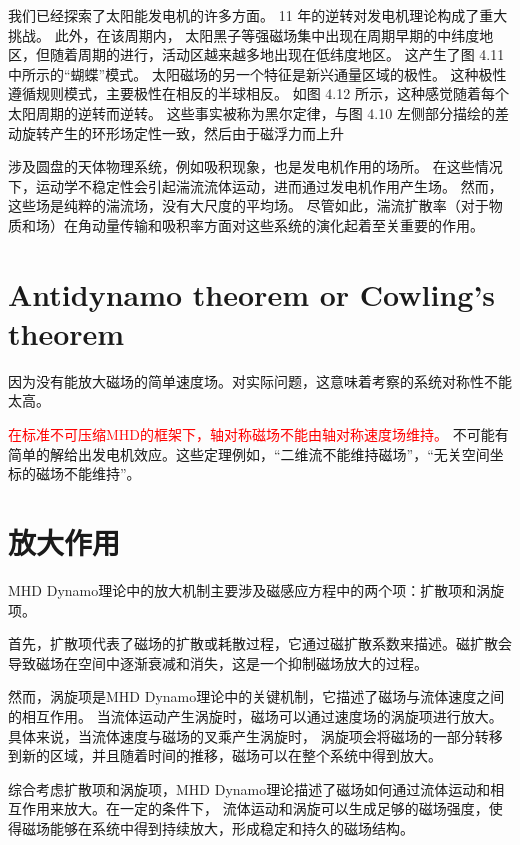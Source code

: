 \documentclass[12pt, a4paper, oneside]{ctexart}
\begin{document}
\begin{spacing}{2.0}
我们已经探索了太阳能发电机的许多方面。 11 年的逆转对发电机理论构成了重大挑战。 此外，在该周期内，
太阳黑子等强磁场集中出现在周期早期的中纬度地区，但随着周期的进行，活动区越来越多地出现在低纬度地区。 这产生了图 4.11 中所示的“蝴蝶”模式。 
太阳磁场的另一个特征是新兴通量区域的极性。 这种极性遵循规则模式，主要极性在相反的半球相反。 如图 4.12 所示，这种感觉随着每个太阳周期的逆转而逆转。 
这些事实被称为黑尔定律，与图 4.10 左侧部分描绘的差动旋转产生的环形场定性一致，然后由于磁浮力而上升

涉及圆盘的天体物理系统，例如吸积现象，也是发电机作用的场所。 在这些情况下，运动学不稳定性会引起湍流流体运动，进而通过发电机作用产生场。 
然而，这些场是纯粹的湍流场，没有大尺度的平均场。 尽管如此，湍流扩散率（对于物质和场）在角动量传输和吸积率方面对这些系统的演化起着至关重要的作用。


\section{Antidynamo theorem or Cowling's theorem}

因为没有能放大磁场的简单速度场。对实际问题，这意味着考察的系统对称性不能太高。

\textcolor{red}{在标准不可压缩MHD的框架下，轴对称磁场不能由轴对称速度场维持。}
不可能有简单的解给出发电机效应。这些定理例如，“二维流不能维持磁场”，“无关空间坐标的磁场不能维持”。


\section{放大作用}
MHD Dynamo理论中的放大机制主要涉及磁感应方程中的两个项：扩散项和涡旋项。

首先，扩散项代表了磁场的扩散或耗散过程，它通过磁扩散系数来描述。磁扩散会导致磁场在空间中逐渐衰减和消失，这是一个抑制磁场放大的过程。

然而，涡旋项是MHD Dynamo理论中的关键机制，它描述了磁场与流体速度之间的相互作用。
当流体运动产生涡旋时，磁场可以通过速度场的涡旋项进行放大。具体来说，当流体速度与磁场的叉乘产生涡旋时，
涡旋项会将磁场的一部分转移到新的区域，并且随着时间的推移，磁场可以在整个系统中得到放大。

综合考虑扩散项和涡旋项，MHD Dynamo理论描述了磁场如何通过流体运动和相互作用来放大。在一定的条件下，
流体运动和涡旋可以生成足够的磁场强度，使得磁场能够在系统中得到持续放大，形成稳定和持久的磁场结构。



\end{spacing}
\end{document}
